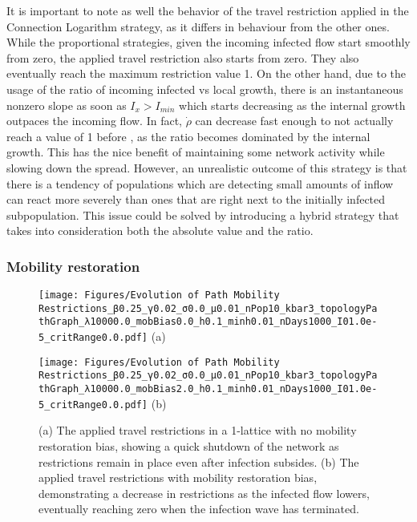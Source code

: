 It is important to note as well the behavior of the travel restriction applied in the Connection Logarithm strategy, as it differs in behaviour from the other ones. While the proportional strategies, given the incoming infected flow start smoothly from zero, the applied travel restriction also starts from zero. They also eventually reach the maximum restriction value 1. On the other hand, due to the usage of the ratio of incoming infected vs local growth, there is an instantaneous nonzero slope as soon as $I_x>I_{min}$ which starts decreasing as the internal growth outpaces the incoming flow. In fact, $\dot \rho$ can decrease fast enough to not actually reach a value of 1 before , as the ratio becomes dominated by the internal growth. This has the nice benefit of maintaining some network activity while slowing down the spread. However, an unrealistic outcome of this strategy is that there is a tendency of populations which are detecting small amounts of inflow can react more severely than ones that are right next to the initially infected subpopulation. This issue could be solved by introducing a hybrid strategy that takes into consideration both the absolute value and the ratio. 

\subsubsection{Mobility restoration}
\begin{figure}[!ht]
	\centering
	\begin{minipage}[b]{0.45\textwidth}
		\texttt{[image: Figures/Evolution of Path Mobility Restrictions\_β0.25\_γ0.02\_σ0.0\_μ0.01\_nPop10\_kbar3\_topologyPathGraph\_λ10000.0\_mobBias0.0\_h0.1\_minh0.01\_nDays1000\_I01.0e-5\_critRange0.0.pdf]}
		\centering
		(a)
	\end{minipage}
	\hfill
	\begin{minipage}[b]{0.45\textwidth}
		\texttt{[image: Figures/Evolution of Path Mobility Restrictions\_β0.25\_γ0.02\_σ0.0\_μ0.01\_nPop10\_kbar3\_topologyPathGraph\_λ10000.0\_mobBias2.0\_h0.1\_minh0.01\_nDays1000\_I01.0e-5\_critRange0.0.pdf]}
		\centering
		(b)
	\end{minipage}
	\caption{\small (a) The applied travel restrictions in a 1-lattice with no mobility restoration bias, showing a quick shutdown of the network as restrictions remain in place even after infection subsides. (b) The applied travel restrictions with mobility restoration bias, demonstrating a decrease in restrictions as the infected flow lowers, eventually reaching zero when the infection wave has terminated.}	\label{fig:Evolution-Restriction-without-and-with-bias}
\end{figure}

